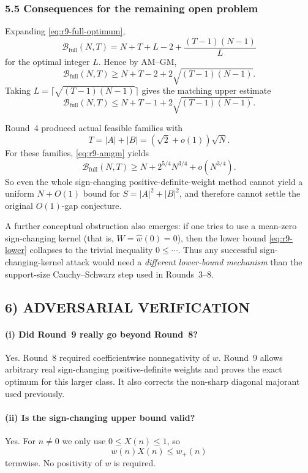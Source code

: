 \subsubsection{5.5 Consequences for the remaining open problem}

Expanding \eqref{eq:r9-full-optimum},
\[
\mathcal B_{\mathrm{full}}(N,T)
=
N+T+L-2+\frac{(T-1)(N-1)}{L}
\]
for the optimal integer \(L\).  Hence by AM--GM,
\begin{equation}
\label{eq:r9-amgm}
\mathcal B_{\mathrm{full}}(N,T)
\ge N+T-2+2\sqrt{(T-1)(N-1)}.
\end{equation}
Taking \(L=\lceil \sqrt{(T-1)(N-1)}\rceil\) gives the matching upper estimate
\begin{equation}
\label{eq:r9-nearopt}
\mathcal B_{\mathrm{full}}(N,T)
\le N+T-1+2\sqrt{(T-1)(N-1)}.
\end{equation}

Round~4 produced actual feasible families with
\[
T=|A|+|B|=(\sqrt2+o(1))\sqrt N.
\]
For these families, \eqref{eq:r9-amgm} yields
\[
\mathcal B_{\mathrm{full}}(N,T)
\ge N + 2^{5/4}N^{3/4}+o(N^{3/4}).
\]
So even the whole sign-changing positive-definite-weight method cannot yield a uniform \(N+O(1)\) bound for \(S=|A|^2+|B|^2\), and therefore cannot settle the original \(O(1)\)-gap conjecture.

A further conceptual obstruction also emerges: if one tries to use a mean-zero sign-changing kernel (that is, \(W=\widehat w(0)=0\)), then the lower bound \eqref{eq:r9-lower} collapses to the trivial inequality \(0\le \cdots\).  Thus any successful sign-changing-kernel attack would need a \emph{different lower-bound mechanism} than the support-size Cauchy--Schwarz step used in Rounds~3--8.

\subsection{6) ADVERSARIAL VERIFICATION}

\paragraph{(i) Did Round~9 really go beyond Round~8?}
Yes.  Round~8 required coefficientwise nonnegativity of \(w\).  Round~9 allows arbitrary real sign-changing positive-definite weights and proves the exact optimum for this larger class.  It also corrects the non-sharp diagonal majorant used previously.

\paragraph{(ii) Is the sign-changing upper bound valid?}
Yes.  For \(n\ne 0\) we only use \(0\le X(n)\le 1\), so
\[
w(n)X(n)\le w_+(n)
\]
termwise.  No positivity of \(w\) is required.

